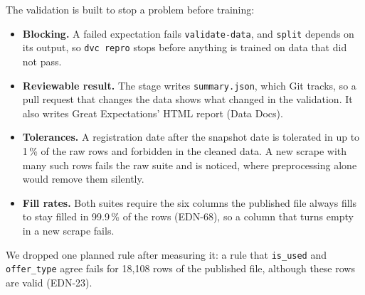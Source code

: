 The validation is built to stop a problem before training:

\begin{itemize}
  \item \textbf{Blocking.} A failed expectation fails \texttt{validate-data}, and \texttt{split} depends on its output, so \texttt{dvc repro} stops before anything is trained on data that did not pass.
  \item \textbf{Reviewable result.} The stage writes \texttt{summary.json}, which Git tracks, so a pull request that changes the data shows what changed in the validation. It also writes Great Expectations' HTML report (Data Docs).
  \item \textbf{Tolerances.} A registration date after the snapshot date is tolerated in up to 1\,\% of the raw rows and forbidden in the cleaned data. A new scrape with many such rows fails the raw suite and is noticed, where preprocessing alone would remove them silently.
  \item \textbf{Fill rates.} Both suites require the six columns the published file always fills to stay filled in 99.9\,\% of the rows (EDN-68), so a column that turns empty in a new scrape fails.
\end{itemize}

We dropped one planned rule after measuring it: a rule that \texttt{is\_used} and \texttt{offer\_type} agree fails for 18,108 rows of the published file, although these rows are valid (EDN-23).

